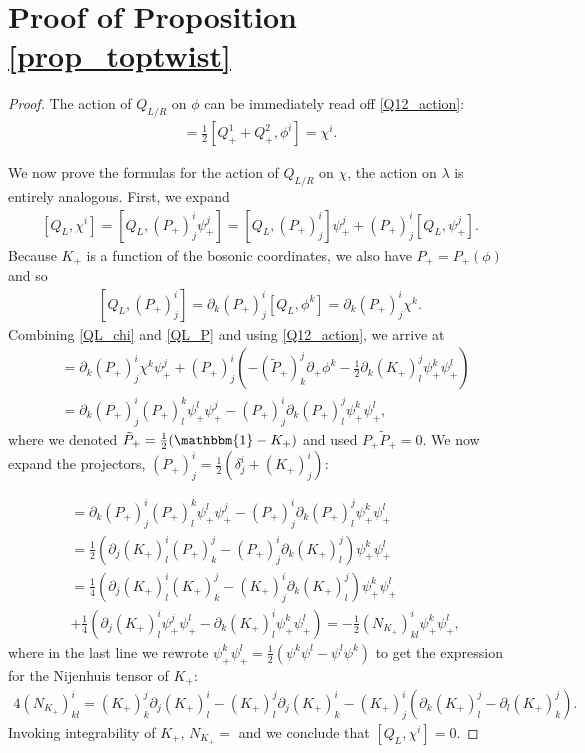 \documentclass[letterpaper,12pt]{article}
\newcommand{\id}{\mathbbm{1}}
\newcommand{\p}{\partial}
\def\tl{\tilde}
\theoremstyle{definition}
\theoremstyle{remark}
\theoremstyle{examples}
\begin{document}
\section{Proof of Proposition \ref{prop_toptwist}}\label{appendix:proof_prop}
\begin{proof}
The action of $Q_{L/R}$ on $\phi$ can be immediately read off \eqref{Q12_action}:
\begin{align}
[Q_L,\phi^i]=\frac{1}{2}[Q_+^1+Q^2_+,\phi^i]=\chi^i.
\end{align}

We now prove the formulas for the action of $Q_{L/R}$ on $\chi$, the action on $\lambda$ is entirely analogous. First, we expand
\begin{align}\label{QL_chi}
[Q_L,\chi^i]=[Q_L,(P_+)^i_j\psi_+^j]=[Q_L,(P_+)^i_j]\psi_+^j{+}(P_+)^i_j[Q_L,\psi_+^j].
\end{align}
Because $K_+$ is a function of the bosonic coordinates, we also have $P_+=P_+(\phi)$ and so
\begin{align}\label{QL_P}
[Q_L,(P_+)^i_j]=\p_k(P_+)^i_j[Q_L,\phi^k]=\p_k(P_+)^i_j\chi^k.
\end{align}
Combining \eqref{QL_chi} and \eqref{QL_P} and using \eqref{Q12_action}, we arrive at
\begin{align*}
[Q_L,\chi^i]&=\p_k(P_+)^i_j\chi^k\psi_+^j{+}(P_+)^i_j\left(-(\tl{P}_+)^j_k\p_+\phi^k{-}\frac{1}{2}\p_k(K_+)^j_l\psi_+^k\psi_+^l\right)\\
&=\p_k(P_+)^i_j(P_+)^k_l\psi_+^l\psi_+^j{-}(P_+)^i_j\p_k(P_+)^j_l\psi_+^k\psi_+^l,
\end{align*}
where we denoted $\tl{P}_+=\frac{1}{2}(\id-K_+)$ and used $P_+\tl{P}_+=0$. We now expand the projectors, $(P_+)^i_j=\frac{1}{2}(\delta^i_j+(K_+)^i_j)$:

\begin{align*}
[Q_L,\chi^i]&=\p_k(P_+)^i_j(P_+)^k_l\psi_+^l\psi_+^j{-}(P_+)^i_j\p_k(P_+)^j_l\psi_+^k\psi_+^l\\
&=\frac{1}{2}(\p_j(K_+)^i_l(P_+)^j_k{-}(P_+)^i_j\p_k(K_+)^j_l)\psi_+^k\psi_+^l\\
&=\frac{1}{4}(\p_j(K_+)^i_l(K_+)^j_k{-}(K_+)^i_j\p_k(K_+)^j_l)\psi_+^k\psi_+^l\\
&+\frac{1}{4}(\p_j(K_+)^i_l\psi_+^j\psi_+^l{-}\p_k(K_+)^i_l\psi_+^k\psi_+^l)=-\frac{1}{2}(N_{K_+})^i_{kl}\psi_+^k\psi^l_+,
\end{align*}
where in the last line we rewrote $\psi_+^k\psi^l_+=\frac{1}{2}(\psi^k\psi^l-\psi^l\psi^k)$ to get the expression for the Nijenhuis tensor of $K_+$:
\begin{align*}
4(N_{K_+})^i_{kl}=(K_+)^j_k\p_j(K_+)^i_l-(K_+)^j_l\p_j(K_+)^i_k {-} (K_+)^i_j(\p_k(K_+)^j_l-\p_l(K_+)^j_k).
\end{align*}
Invoking integrability of $K_+$, $N_{K_+}=$ and we conclude that $[Q_L,\chi^i]=0$.


\end{proof}
\end{document}
